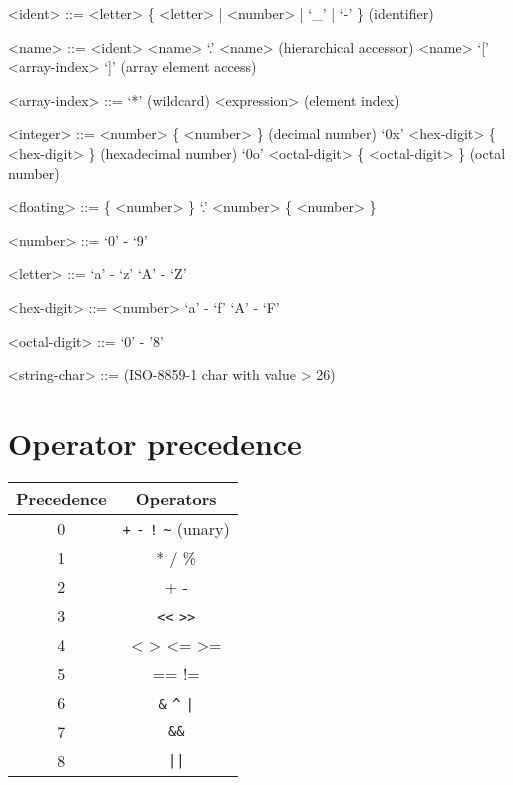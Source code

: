 \documentclass{article}
\begin{document}
\begin{grammar}
  <ident> ::= <letter> \{ <letter> | <number> | `_' | `-' \} (identifier)

  <name> ::= <ident>
  \alt <name> `.' <name> (hierarchical accessor)
  \alt <name> `[' <array-index> `]' (array element access)

  <array-index> ::= `*' (wildcard)
  \alt <expression> (element index)

  <integer> ::= <number> \{ <number> \} (decimal number)
  \alt `0x' <hex-digit> \{ <hex-digit> \} (hexadecimal number)
  \alt `0o' <octal-digit> \{ <octal-digit> \} (octal number)

  <floating> ::= \{ <number> \} `.' <number> \{ <number> \}
  
  <number> ::= `0' - `9'

  <letter> ::= `a' - `z'
  \alt `A' - `Z'

  <hex-digit> ::= <number>
  \alt `a' - `f'
  \alt `A' - `F'

  <octal-digit> ::= `0' - '8'

  <string-char> ::= (ISO-8859-1 char with value > 26)

\end{grammar}

\section*{Operator precedence}
\begin{centering}
\begin{tabular}{cc}
  \toprule
  \textbf{Precedence} & \textbf{Operators}\\
  \midrule
  0 & \verb!+! \verb!-! \verb|!| \verb!~! (unary)\\
  1 & * / \% \\
  2 & + - \\
  3 & \verb!<<! \verb!>>! \\
  4 & < > <= >= \\
  5 & == != \\
  6 & \verb!&! \verb!^! \verb!|! \\
  7 & \verb!&&! \\
  8 & \verb!||! \\
  \bottomrule
\end{tabular}
\end{centering}
\end{document}
